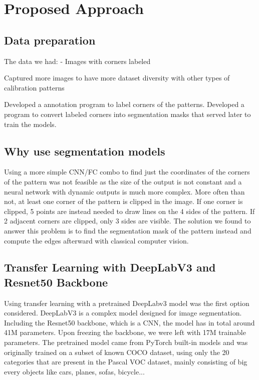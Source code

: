 \documentclass{ieeeaccess}
\begin{document}
\section{Proposed Approach}

\subsection{Data preparation}

The data we had:
  -  Images with corners labeled

Captured more images to have more dataset diversity with other types of calibration patterns

Developed a annotation program to label corners of the patterns. 
Developed a program to convert labeled corners into segmentation masks that served later to train the models.

\subsection{Why use segmentation models}

Using a more simple CNN/FC combo to find just the coordinates of the corners of the pattern was not feasible as the size of the output is not
constant and a neural network with dynamic outputs is much more complex. More often than not, at least one corner of the pattern is
clipped in the image. If one corner is clipped, 5 points are instead needed to draw lines on the 4 sides of the pattern. If 2 adjacent corners
are clipped, only 3 sides are visible. The solution we found to answer this problem is to find the segmentation mask of the pattern
instead and compute the edges afterward with classical computer vision. 

\subsection{Transfer Learning with DeepLabV3 and Resnet50 Backbone}

Using transfer learning with a pretrained DeepLabv3 model was the first option considered. DeepLabV3 is a complex model designed for
image segmentation. Including the Resnet50 backbone, which is a CNN, the model has in total around 41M parameters. Upon freezing the
backbone, we were left with 17M trainable parameters. The pretrained model came from PyTorch built-in models and was originally trained
on a subset of known COCO dataset, using only the 20 categories that are present in the Pascal VOC dataset, mainly consisting of big
every objects like cars, planes, sofas, bicycle...
\end{document}

